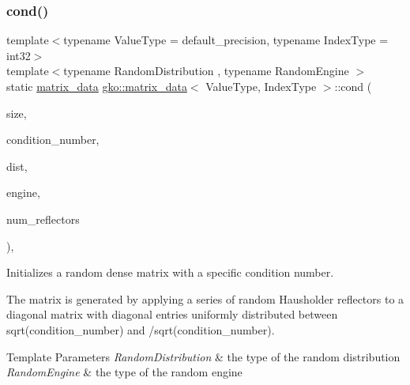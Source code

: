 \subsubsection{\texorpdfstring{cond()}{cond()}\hspace{0.1cm}{\footnotesize\ttfamily [1/2]}}
{\footnotesize\ttfamily template$<$typename Value\+Type = default\+\_\+precision, typename Index\+Type = int32$>$ \\
template$<$typename Random\+Distribution , typename Random\+Engine $>$ \\
static \hyperlink{structgko_1_1matrix__data}{matrix\+\_\+data} \hyperlink{structgko_1_1matrix__data}{gko\+::matrix\+\_\+data}$<$ Value\+Type, Index\+Type $>$\+::cond (\begin{DoxyParamCaption}\item[{\hyperlink{namespacegko_a6e5c95df0ae4e47aab2f604a22d98ee7}{size\+\_\+type}}]{size,  }\item[{\hyperlink{namespacegko_adfcb75c44f6b6c701989419c166f6e7e}{remove\+\_\+complex}$<$ Value\+Type $>$}]{condition\+\_\+number,  }\item[{Random\+Distribution \&\&}]{dist,  }\item[{Random\+Engine \&\&}]{engine,  }\item[{\hyperlink{namespacegko_a6e5c95df0ae4e47aab2f604a22d98ee7}{size\+\_\+type}}]{num\+\_\+reflectors }\end{DoxyParamCaption})\hspace{0.3cm}{\ttfamily [inline]}, {\ttfamily [static]}}



Initializes a random dense matrix with a specific condition number. 

The matrix is generated by applying a series of random Hausholder reflectors to a diagonal matrix with diagonal entries uniformly distributed between {\ttfamily sqrt(condition\+\_\+number)} and {/sqrt(condition\+\_\+number)}.


\begin{DoxyTemplParams}{Template Parameters}
{\em Random\+Distribution} & the type of the random distribution \\
\hline
{\em Random\+Engine} & the type of the random engine\\
\hline
\end{DoxyTemplParams}

